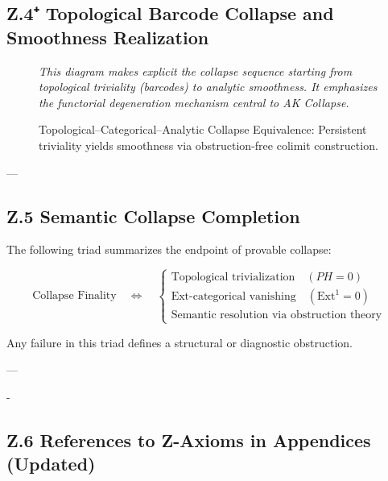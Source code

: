 \documentclass[11pt]{article}
\DeclareMathOperator{\colim}{colim}
\begin{document}
\begin{axiom}
\begin{axiom}
{{\subsection*{Z.4⁺ Topological Barcode Collapse and Smoothness Realization}

\begin{figure}[H]
\centering
{}

\caption{Topological–Categorical–Analytic Collapse Equivalence: Persistent triviality yields smoothness via obstruction-free colimit construction.}

\textit{This diagram makes explicit the collapse sequence starting from topological triviality (barcodes) to analytic smoothness.  
It emphasizes the functorial degeneration mechanism central to AK Collapse.}
\end{figure}

---

\subsection*{Z.5 Semantic Collapse Completion}

The following triad summarizes the endpoint of provable collapse:

\[
\text{Collapse Finality} \quad \Longleftrightarrow \quad
\begin{cases}
\text{Topological trivialization} \quad (PH = 0) \\
\text{Ext-categorical vanishing} \quad (\mathrm{Ext}^1 = 0) \\
\text{Semantic resolution via obstruction theory}
\end{cases}
\]

Any failure in this triad defines a structural or diagnostic obstruction.

---

-\subsection*{Z.6 References to Z-Axioms in Appendices (Updated)}

}}
\end{axiom}
\end{axiom}
\end{document}
